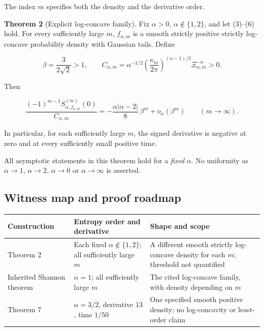 \documentclass[
  11pt,
]{article}
\newcounter{none} %
\begin{document}
The index \(m\) specifies both the density and the derivative order.

\textbf{Theorem 2} (Explicit log-concave family). Fix \(\alpha>0\),
\(\alpha\notin\{1,2\}\), and let (3)--(6) hold. For every sufficiently
large \(m\), \(f_{\alpha,m}\) is a smooth strictly positive strictly
log-concave probability density with Gaussian tails. Define

\[
\tag{7}
 \beta=\frac{3}{2\sqrt2}>1,\qquad
 C_{\alpha,m}=\alpha^{-1/2}
       \left(\frac{\kappa_m}{2\pi}\right)^{(\alpha-1)/2}
       \Xi_{\alpha,m}^{-\alpha}>0.
\]

Then

\[
\tag{8}
 \frac{(-1)^{m-1}S_{\alpha,f_{\alpha,m}}^{(m)}(0)}{C_{\alpha,m}}
 =-\frac{\alpha|\alpha-2|}{8}\,\beta^m+o_\alpha(\beta^m)
 \qquad(m\to\infty).
\]

In particular, for each sufficiently large \(m\), the signed derivative
is negative at zero and at every sufficiently small positive time.

All asymptotic statements in this theorem hold for a \emph{fixed}
\(\alpha\). No uniformity as \(\alpha\to1\), \(\alpha\to2\),
\(\alpha\to0\) or \(\alpha\to\infty\) is asserted.

\clearpage
\subsection{Witness map and proof
roadmap}\label{witness-map-and-proof-roadmap}

{\def\LTcaptype{none} %
\begin{longtable}[]{@{}
  >{\raggedright\arraybackslash}p{}
  >{\raggedright\arraybackslash}p{}
  >{\raggedright\arraybackslash}p{}@{}}
\toprule\noalign{}
\begin{minipage}[b]{\linewidth}\raggedright
Construction
\end{minipage} & \begin{minipage}[b]{\linewidth}\raggedright
Entropy order and derivative
\end{minipage} & \begin{minipage}[b]{\linewidth}\raggedright
Shape and scope
\end{minipage} \\
\midrule\noalign{}
\endhead
\bottomrule\noalign{}
\endlastfoot
Theorem 2 & Each fixed \(\alpha\notin\{1,2\}\); all sufficiently large
\(m\) & A different smooth strictly log-concave density for each \(m\);
threshold not quantified \\
Inherited Shannon theorem & \(\alpha=1\); all sufficiently large \(m\) &
The cited log-concave family, with density depending on \(m\) \\
Theorem 7 & \(\alpha=3/2\), derivative \(13\), time \(1/50\) & One
specified smooth positive density; no log-concavity or least-order
claim \\
\end{longtable}
}
\end{document}
